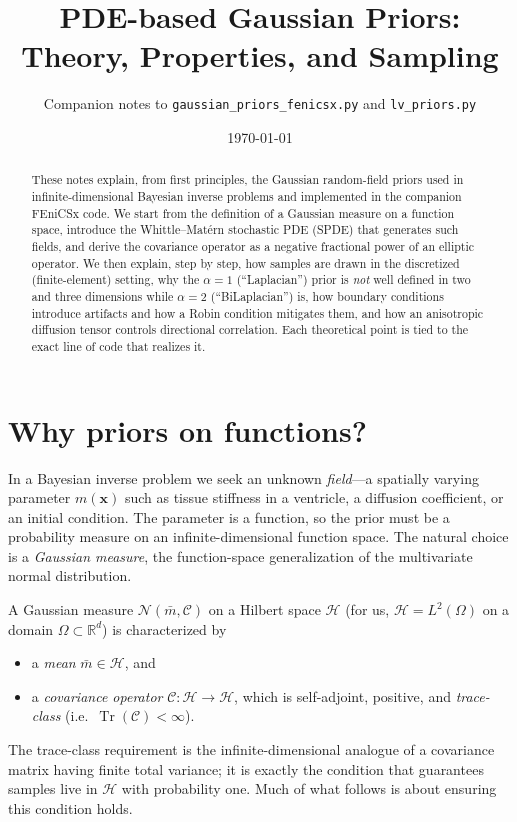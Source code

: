 \documentclass[11pt]{article}
\title{\bf PDE-based Gaussian Priors:\\
       Theory, Properties, and Sampling}
\author{Companion notes to \texttt{gaussian\_priors\_fenicsx.py}
        and \texttt{lv\_priors.py}}
\date{\today}
\theoremstyle{definition}
\theoremstyle{plain}
\theoremstyle{remark}
\newcommand{\R}{\mathbb{R}}
\newcommand{\Nc}{\mathcal{N}}
\newcommand{\Cc}{\mathcal{C}}
\newcommand{\Hc}{\mathcal{H}}
\newcommand{\Tr}{\operatorname{Tr}}
\newcommand{\bx}{\bm{x}}
\begin{document}
\maketitle

\begin{abstract}
These notes explain, from first principles, the Gaussian random-field priors
used in infinite-dimensional Bayesian inverse problems and implemented in the
companion FEniCSx code. We start from the definition of a Gaussian measure on a
function space, introduce the Whittle--Mat\'ern stochastic PDE (SPDE) that
generates such fields, and derive the covariance operator as a negative
fractional power of an elliptic operator. We then explain, step by step, how
samples are drawn in the discretized (finite-element) setting, why the
$\alpha=1$ (``Laplacian'') prior is \emph{not} well defined in two and three
dimensions while $\alpha=2$ (``BiLaplacian'') is, how boundary conditions
introduce artifacts and how a Robin condition mitigates them, and how an
anisotropic diffusion tensor controls directional correlation. Each theoretical
point is tied to the exact line of code that realizes it.
\end{abstract}

\tableofcontents

\section{Why priors on functions?}

In a Bayesian inverse problem we seek an unknown \emph{field}---a spatially
varying parameter $m(\bx)$ such as tissue stiffness in a ventricle, a
diffusion coefficient, or an initial condition. The parameter is a function,
so the prior must be a probability measure on an infinite-dimensional function
space. The natural choice is a \emph{Gaussian measure}, the function-space
generalization of the multivariate normal distribution.

A Gaussian measure $\Nc(\bar m, \Cc)$ on a Hilbert space $\Hc$ (for us,
$\Hc = L^2(\Omega)$ on a domain $\Omega \subset \R^d$) is characterized by
\begin{itemize}[nosep]
  \item a \emph{mean} $\bar m \in \Hc$, and
  \item a \emph{covariance operator} $\Cc : \Hc \to \Hc$, which is
        self-adjoint, positive, and \emph{trace-class}
        (i.e.\ $\Tr(\Cc) < \infty$).
\end{itemize}
The trace-class requirement is the infinite-dimensional analogue of a
covariance matrix having finite total variance; it is exactly the condition
that guarantees samples live in $\Hc$ with probability one. Much of what
follows is about ensuring this condition holds.
\end{document}
